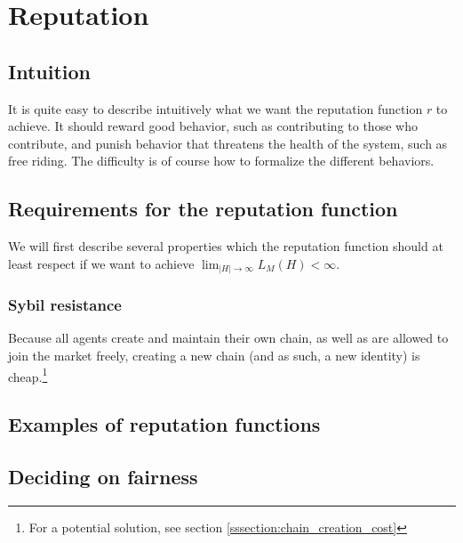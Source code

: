 \chapter{Reputation}\label{chapter:reputation}
\section{Intuition}
It is quite easy to describe intuitively what we want the reputation function $r$ to achieve. 
It should reward good behavior, 
such as contributing to those who contribute, 
and punish behavior that threatens the health of the system, 
such as free riding. 
The difficulty is of course how to formalize the different behaviors.

\section{Requirements for the reputation function}\label{section:requirements_reputation}
We will first describe several properties which the reputation function should at least respect if we want to achieve $\lim_{|H| \to \infty} L_M(H) < \infty$.

\subsection{Sybil resistance}
Because all agents create and maintain their own chain, as well as are allowed to join the market freely, creating a new chain (and as such, a new identity) is cheap.\footnote{For a potential solution, see section \ref{sssection:chain_creation_cost}}

\section{Examples of reputation functions}\label{section:examples_reputation_functions}

\section{Deciding on fairness}

